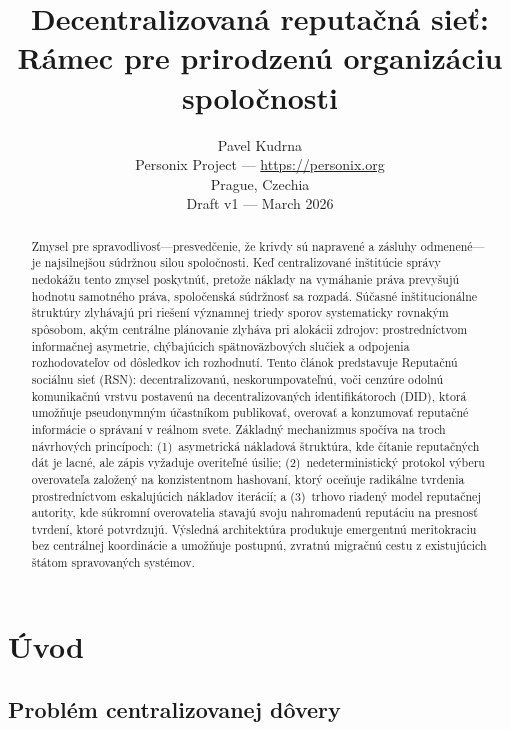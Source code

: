 \documentclass[11pt,a4paper,twocolumn]{article}
\title{\textbf{Decentralizovaná reputačná sieť:\\Rámec pre prirodzenú organizáciu spoločnosti}}
\author{Pavel Kudrna\\Personix Project --- \url{https://personix.org}\\Prague, Czechia\\Draft v1 --- March 2026}
\date{}
\begin{document}
\maketitle

\begin{abstract}
Zmysel pre spravodlivosť---presvedčenie, že krivdy sú napravené a zásluhy odmenené---je najsilnejšou súdržnou silou spoločnosti. Keď centralizované inštitúcie správy nedokážu tento zmysel poskytnúť, pretože náklady na vymáhanie práva prevyšujú hodnotu samotného práva, spoločenská súdržnosť sa rozpadá. Súčasné inštitucionálne štruktúry zlyhávajú pri riešení významnej triedy sporov systematicky rovnakým spôsobom, akým centrálne plánovanie zlyháva pri alokácii zdrojov: prostredníctvom informačnej asymetrie, chýbajúcich spätnoväzbových slučiek a odpojenia rozhodovateľov od dôsledkov ich rozhodnutí. Tento článok predstavuje Reputačnú sociálnu sieť (RSN): decentralizovanú, neskorumpovateľnú, voči cenzúre odolnú komunikačnú vrstvu postavenú na decentralizovaných identifikátoroch (DID), ktorá umožňuje pseudonymným účastníkom publikovať, overovať a konzumovať reputačné informácie o správaní v reálnom svete. Základný mechanizmus spočíva na troch návrhových princípoch: (1)~asymetrická nákladová štruktúra, kde čítanie reputačných dát je lacné, ale zápis vyžaduje overiteľné úsilie; (2)~nedeterministický protokol výberu overovateľa založený na konzistentnom hashovaní, ktorý oceňuje radikálne tvrdenia prostredníctvom eskalujúcich nákladov iterácií; a (3)~trhovo riadený model reputačnej autority, kde súkromní overovatelia stavajú svoju nahromadenú reputáciu na presnosť tvrdení, ktoré potvrdzujú. Výsledná architektúra produkuje emergentnú meritokraciu bez centrálnej koordinácie a umožňuje postupnú, zvratnú migračnú cestu z existujúcich štátom spravovaných systémov.
\end{abstract}

\section{Úvod}

\subsection{Problém centralizovanej dôvery}
\end{document}
